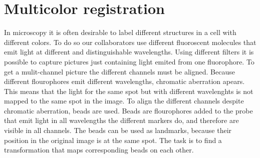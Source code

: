 \chapter{Multicolor registration}
In microscopy it is often desirable to label different structures in a cell with
different colors. To do so our collaborators use different fluoroscent molecules
that emit light at different and distinguishable wavelengths. Using different
filters it is possible to capture pictures just containing light emited from one
fluorophore. To get a mulit-channel picture the different channels must be
aligned. Because different flourophores emit different wavelengths, chromatic
aberration apears. This means that the light for the same spot but with
different wavelenghts is not mapped to the same spot in the image. To align the
different channels despite chromatic aberration, beads are used. Beads are
flourophores added to the probe that emit light in all wavelengths the
different markers do, and therefore are visible in all channels. The beads can be
used as landmarks, because their position in the original image is at the same
spot. The task is to find a transformation that maps corresponding beads on each
other.

